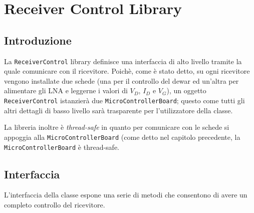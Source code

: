 \chapter{Receiver Control Library}

\section{Introduzione}
La \texttt{ReceiverControl} library definisce una interfaccia di alto livello
tramite la quale comunicare con il ricevitore. Poich\`e, come \`e stato detto, su ogni ricevitore
vengono installate due schede (una per il controllo del dewar ed un'altra
per alimentare gli LNA e leggerne i valori di $V_D$, $I_D$ e $V_G$), un oggetto \texttt{ReceiverControl}
istanzier\`a due \texttt{MicroControllerBoard}; questo come tutti gli altri dettagli di basso livello
sar\`a trasparente per l'utilizzatore della classe.

La libreria inoltre \`e \emph{thread-safe} in quanto per comunicare con 
le schede si appoggia alla \texttt{MicroControllerBoard}
(come detto nel capitolo precedente, la \texttt{MicroControllerBoard} \`e thread-safe.


\section{Interfaccia}
L'interfaccia della classe espone una serie di metodi che consentono di avere un completo controllo
del ricevitore. 

